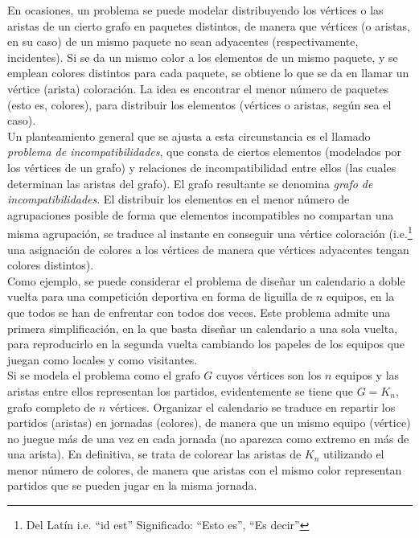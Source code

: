 En ocasiones, un problema se puede modelar distribuyendo los vértices o las aristas de un cierto grafo en paquetes distintos, de manera que vértices (o aristas, en su caso) de un mismo paquete no sean adyacentes (respectivamente, incidentes). Si se da un mismo color a los elementos de un mismo paquete, y se emplean colores distintos para cada paquete, se obtiene lo que se da en llamar un vértice (arista) coloración. La idea es encontrar el menor número de paquetes (esto es, colores), para distribuir los elementos (vértices o aristas, según sea el caso).\\

Un planteamiento general que se ajusta a esta circunstancia es el llamado \emph{problema de incompatibilidades}, que consta de ciertos elementos (modelados por los vértices de un grafo) y relaciones de incompatibilidad entre ellos (las cuales determinan las aristas del grafo). El grafo resultante se denomina \emph{grafo de incompatibilidades}. El distribuir los elementos en el menor número de agrupaciones posible de forma que elementos incompatibles no compartan una misma agrupación, se traduce al instante en conseguir una vértice coloración (i.e.\footnote{Del Latín i.e. ``id est'' Significado: ``Esto es'', ``Es decir''} una asignación de colores a los vértices de manera que vértices adyacentes tengan colores distintos).\\

Como ejemplo, se puede considerar el problema de diseñar un calendario a doble vuelta para una competición deportiva en forma de liguilla de $n$ equipos, en la que todos se han de enfrentar con todos dos veces. Este problema admite una primera simplificación, en la que basta diseñar un calendario a una sola vuelta, para reproducirlo en la segunda vuelta cambiando los papeles de los equipos que juegan como locales y como visitantes.\\

Si se modela el problema como el grafo $G$ cuyos vértices son los $n$ equipos y las aristas entre ellos representan los partidos, evidentemente se tiene que $G = K_n$, grafo completo de $n$ vértices. Organizar el calendario se traduce en repartir los partidos (aristas) en jornadas (colores), de manera que un mismo equipo (vértice) no juegue más de una vez en cada jornada (no aparezca como extremo en más de una arista). En definitiva, se trata de colorear las aristas de $K_n$ utilizando el menor número de colores, de manera que aristas con el mismo color representan partidos que se pueden jugar en la misma jornada.\\


